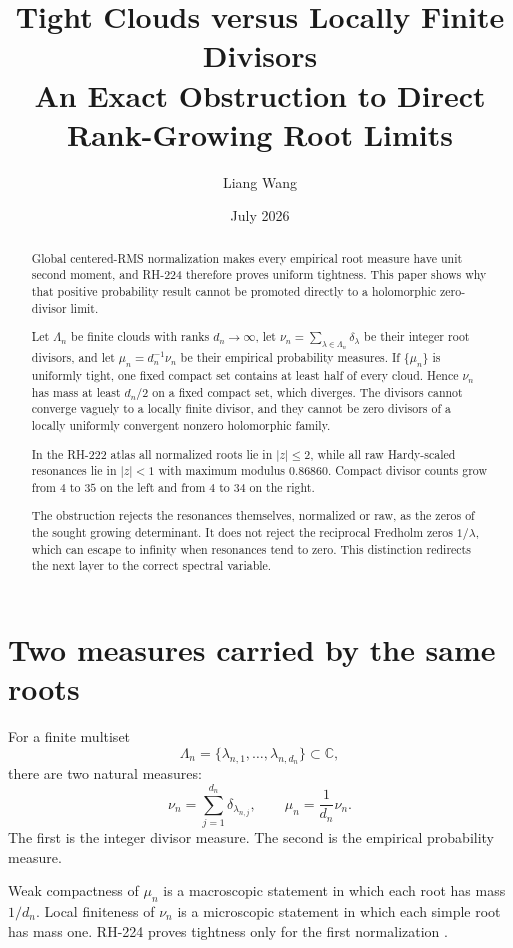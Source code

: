 \documentclass[11pt]{article}
\title{Tight Clouds versus Locally Finite Divisors\\
\large An Exact Obstruction to Direct Rank-Growing Root Limits}
\author{Liang Wang}
\date{July 2026}
\theoremstyle{remark}\newtheorem{remark}[theorem]{Remark}
\newcommand{\C}{\mathbb C}
\begin{document}
\maketitle

\begin{abstract}
Global centered-RMS normalization makes every empirical root measure have
unit second moment, and RH-224 therefore proves uniform tightness. This paper
shows why that positive probability result cannot be promoted directly to a
holomorphic zero-divisor limit.

Let $\Lambda_n$ be finite clouds with ranks $d_n\to\infty$, let
$\nu_n=\sum_{\lambda\in\Lambda_n}\delta_\lambda$ be their integer root
divisors, and let $\mu_n=d_n^{-1}\nu_n$ be their empirical probability
measures. If $\{\mu_n\}$ is uniformly tight, one fixed compact set contains at
least half of every cloud. Hence $\nu_n$ has mass at least $d_n/2$ on a fixed
compact set, which diverges. The divisors cannot converge vaguely to a locally
finite divisor, and they cannot be zero divisors of a locally uniformly
convergent nonzero holomorphic family.

In the RH-222 atlas all normalized roots lie in $|z|\le2$, while all raw
Hardy-scaled resonances lie in $|z|<1$ with maximum modulus $0.86860$.
Compact divisor counts grow from $4$ to $35$ on the left and from $4$ to $34$
on the right.

The obstruction rejects the resonances themselves, normalized or raw, as the
zeros of the sought growing determinant. It does not reject the reciprocal
Fredholm zeros $1/\lambda$, which can escape to infinity when resonances tend
to zero. This distinction redirects the next layer to the correct spectral
variable.
\end{abstract}

\section{Two measures carried by the same roots}

For a finite multiset
\[
 \Lambda_n=\{\lambda_{n,1},\ldots,\lambda_{n,d_n}\}\subset\C,
\]
there are two natural measures:
\begin{equation}\label{eq:measures}
 \nu_n=\sum_{j=1}^{d_n}\delta_{\lambda_{n,j}},\qquad
 \mu_n=\frac1{d_n}\nu_n.
\end{equation}
The first is the integer divisor measure. The second is the empirical
probability measure.

Weak compactness of $\mu_n$ is a macroscopic statement in which each root has
mass $1/d_n$. Local finiteness of $\nu_n$ is a microscopic statement in which
each simple root has mass one. RH-224 proves tightness only for the first
normalization \citep{WangRH224}.
\end{document}
